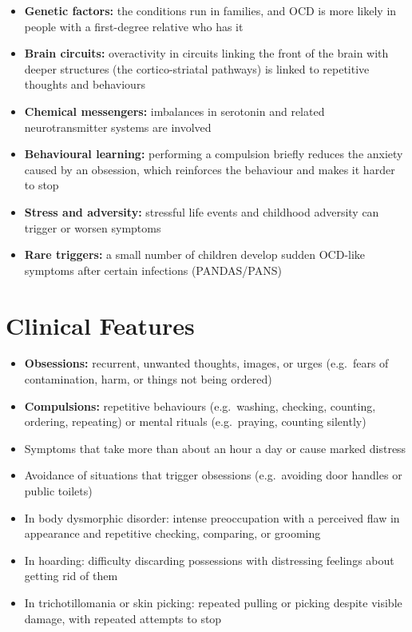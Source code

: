 \begin{itemize}
    \item \textbf{Genetic factors:} the conditions run in families, and OCD is more likely in people with a first-degree relative who has it
    \item \textbf{Brain circuits:} overactivity in circuits linking the front of the brain with deeper structures (the cortico-striatal pathways) is linked to repetitive thoughts and behaviours
    \item \textbf{Chemical messengers:} imbalances in serotonin and related neurotransmitter systems are involved
    \item \textbf{Behavioural learning:} performing a compulsion briefly reduces the anxiety caused by an obsession, which reinforces the behaviour and makes it harder to stop
    \item \textbf{Stress and adversity:} stressful life events and childhood adversity can trigger or worsen symptoms
    \item \textbf{Rare triggers:} a small number of children develop sudden OCD-like symptoms after certain infections (PANDAS/PANS)
\end{itemize}

\section*{Clinical Features}
\begin{itemize}
    \item \textbf{Obsessions:} recurrent, unwanted thoughts, images, or urges (e.g.\ fears of contamination, harm, or things not being ordered)
    \item \textbf{Compulsions:} repetitive behaviours (e.g.\ washing, checking, counting, ordering, repeating) or mental rituals (e.g.\ praying, counting silently)
    \item Symptoms that take more than about an hour a day or cause marked distress
    \item Avoidance of situations that trigger obsessions (e.g.\ avoiding door handles or public toilets)
    \item In body dysmorphic disorder: intense preoccupation with a perceived flaw in appearance and repetitive checking, comparing, or grooming
    \item In hoarding: difficulty discarding possessions with distressing feelings about getting rid of them
    \item In trichotillomania or skin picking: repeated pulling or picking despite visible damage, with repeated attempts to stop
\end{itemize}

